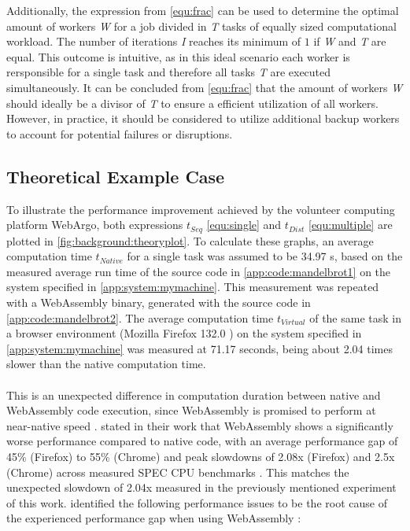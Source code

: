 Additionally, the expression from \eqref{equ:frac} can be used to determine the optimal amount of workers \emph{W} for a job divided in \emph{T} tasks of equally sized computational workload. The number of iterations \emph{I} reaches its minimum of $1$ if \emph{W} and \emph{T} are equal. This outcome is intuitive, as in this ideal scenario each worker is rersponsible for a single task and therefore all tasks \emph{T} are executed simultaneously. It can be concluded from \eqref{equ:frac} that the amount of workers \emph{W} should ideally be a divisor of \emph{T} to ensure a efficient utilization of all workers. However, in practice, it should be considered to utilize additional backup workers to account for potential failures or disruptions.

\subsection{Theoretical Example Case}
\label{subsec:concept:theroy_example}
To illustrate the performance improvement achieved by the volunteer computing platform WebArgo, both expressions $t_{Seq}$ \eqref{equ:single} and $t_{Dist}$ \eqref{equ:multiple} are plotted in \autoref{fig:background:theoryplot}. To calculate these graphs, an average computation time $t_{Native}$ for a single task was assumed to be 34.97 s, based on the measured average run time of the source code in \autoref{app:code:mandelbrot1} on the system specified in \autoref{app:system:mymachine}. This measurement was repeated with a WebAssembly binary, generated with the source code in \autoref{app:code:mandelbrot2}. The average computation time $t_{Virtual}$ of the same task in a browser environment (Mozilla Firefox 132.0 \cite{background:firefox}) on the system specified in \autoref{app:system:mymachine} was measured at 71.17 seconds, being about 2.04 times slower than the native computation time.
\\~\\
This is an unexpected difference in computation duration between native and WebAssembly code execution, since WebAssembly is promised to perform at near-native speed \cite{methodology:wasm, methodology:wasmW3C}. \citeauthor{background:not-so-fast} stated in their work that WebAssembly shows a significantly worse performance compared to native code, with an average performance gap of 45\% (Firefox) to 55\% (Chrome) and peak slowdowns of 2.08x (Firefox) and 2.5x (Chrome) across measured SPEC \acs{CPU} benchmarks \cite{background:not-so-fast}. This matches the unexpected slowdown of 2.04x measured in the previously mentioned experiment of this work. \citeauthor{background:not-so-fast} identified the following performance issues to be the root cause of the experienced performance gap when using WebAssembly \cite{background:not-so-fast}:
